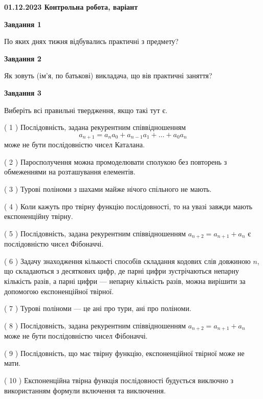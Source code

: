 \documentclass[12pt, ukrainian]{article}
\begin{document}
\begin {large}

\textbf{01.12.2023 Контрольна робота, варіант  }\par


{
{\begin {center}\textbf{Завдання 1}\end {center}}\par
По яких днях тижня відбувались практичні з предмету?\par
{\begin {center}\textbf{Завдання 2}\end {center}}\par
Як зовуть (ім'я, по батькові) викладача, що вів практичні заняття?\par
{\begin {center}\textbf{Завдання 3}\end {center}}\par
Виберіть всі правильні твердження, якщо такі тут є.\par
\vspace{2mm}
( 1 ) Послідовність, задана рекурентним співвідношенням $$a_{n+1}=a_{n}a_{0}+a_{n-1}a_{1}+\ldots+a_0a_{n}$$ може не бути послідовністю чисел Каталана.%

( 2 ) Паросполучення можна промоделювати сполукою без повторень з обмеженнями на розташування елементів.%

( 3 ) Турові поліноми з шахами майже нічого спільного не мають.%

( 4 ) Коли кажуть про твірну функцію послідовності, то на увазі завжди мають експоненційну твірну.%

( 5 ) Послідовність, задана рекурентним співвідношенням $a_{n+2}=a_{n+1}+a_{n}$ є послідовністю чисел Фібоначчі.%

( 6 ) Задачу знаходження кількості способів складання кодових слів довжиною $n$, що складаються з десяткових цифр, де парні цифри зустрічаються непарну кількість разів, а парні цифри — непарну кількість разів, можна вирішити за допомогою експоненційної твірної.%

( 7 ) Турові поліноми --- це ані про тури, ані про поліноми.%

( 8 ) Послідовність, задана рекурентним співвідношенням $a_{n+2}=a_{n+1}+a_{n}$ може не бути послідовністю чисел Фібоначчі.%

( 9 ) Послідовність, що має твірну функцію, експоненційної твірної може не мати.%

( 10 ) Експоненційна твірна функція послідовності будується виключно з використанням формули включення та виключення.%
}
\end {large}

\vspace{4mm}
\newpage
\end{document}
